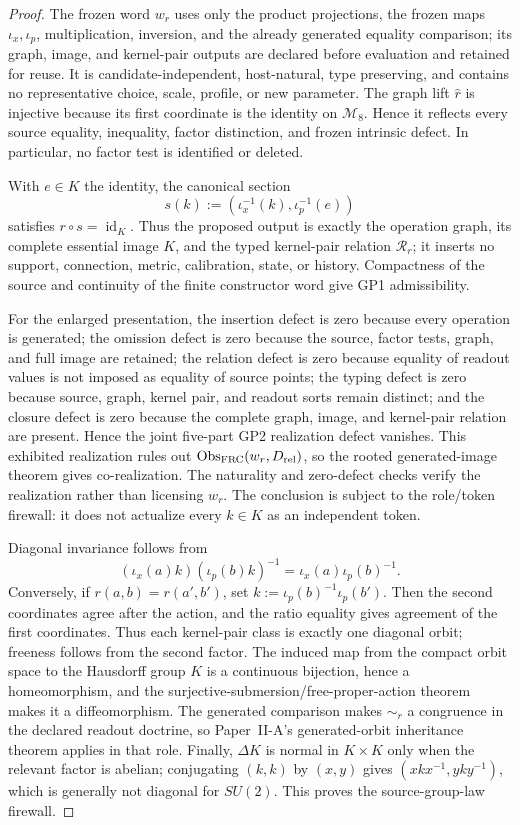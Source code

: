 \documentclass[12pt,a4paper]{article}
\begin{document}
\begin{proof}
The frozen word \(w_r\) uses only the product projections, the frozen maps
\(\iota_x,\iota_p\), multiplication, inversion, and the already generated
equality comparison; its graph, image, and kernel-pair outputs are declared
before evaluation and retained for reuse.  It is candidate-independent,
host-natural, type
preserving, and contains no representative choice, scale, profile, or new
parameter.  The graph lift \(\widehat r\) is injective because its first
coordinate is the identity on \(\mathcal M_8\).  Hence it reflects every
source equality, inequality, factor distinction, and frozen intrinsic defect.
In particular, no factor test is identified or deleted.

With \(e\in K\) the identity, the canonical section
\[
 s(k):=(\iota_x^{-1}(k),\iota_p^{-1}(e))
\]
satisfies \(r\circ s=\operatorname{id}_K\).  Thus the proposed output is
exactly the operation graph, its complete essential image \(K\), and the
typed kernel-pair relation \(\mathcal R_r\); it inserts no support, connection, metric,
calibration, state, or history.  Compactness of the source and continuity of
the finite constructor word give GP1 admissibility.

For the enlarged presentation, the insertion defect is zero because every
operation is generated; the omission defect is zero because the source,
factor tests, graph, and full image are retained; the relation defect is zero
because equality of readout values is not imposed as equality of source
points; the typing defect is zero because source, graph, kernel pair, and
readout sorts remain distinct; and the closure defect is zero because the
complete graph, image, and kernel-pair relation are present.  Hence the joint
five-part GP2 realization defect vanishes.  This exhibited realization rules
out \(\operatorname{Obs}_{\rm FRC}(w_r,D_{\rm rel})\), so the rooted
generated-image theorem gives co-realization.  The naturality and zero-defect
checks verify the realization rather than licensing \(w_r\).  The conclusion
is subject to the role/token firewall: it does not
actualize every \(k\in K\) as an independent token.

Diagonal invariance follows from
\[
 (\iota_x(a)k)(\iota_p(b)k)^{-1}
 =\iota_x(a)\iota_p(b)^{-1}.
\]
Conversely, if \(r(a,b)=r(a',b')\), set
\(k:=\iota_p(b)^{-1}\iota_p(b')\).  Then the second coordinates agree after
the action, and the ratio equality gives agreement of the first coordinates.
Thus each kernel-pair class is exactly one diagonal orbit; freeness follows
from the second factor.  The induced map from the compact orbit space to the
Hausdorff group \(K\) is a continuous bijection, hence a homeomorphism, and
the surjective-submersion/free-proper-action theorem makes it a diffeomorphism.
The generated comparison makes \(\sim_r\) a congruence in the declared
readout doctrine, so Paper~II-A's generated-orbit inheritance theorem applies
in that role.  Finally, \(\Delta K\) is normal in \(K\times K\) only when the
relevant factor is abelian; conjugating \((k,k)\) by \((x,y)\) gives
\((xkx^{-1},yky^{-1})\), which is generally not diagonal for \(SU(2)\).
This proves the source-group-law firewall.
\end{proof}
\end{document}
